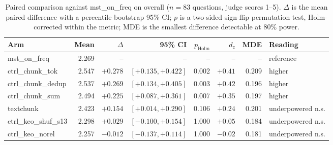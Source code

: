 \begin{table}[t]
\centering
\small
\begin{tabular}{lrrrrrrl}
\toprule
Arm & Mean & $\Delta$ & 95\% CI & $p_{\text{Holm}}$ & $d_z$ & MDE & Reading \\
\midrule
mst\_on\_freq & 2.269 & -- & -- & -- & -- & -- & reference \\
\midrule
ctrl\_chunk\_tok & 2.547 & $+0.278$ & $[+0.135, +0.422]$ & 0.002 & $+0.41$ & 0.209 & higher \\
ctrl\_chunk\_dedup & 2.537 & $+0.269$ & $[+0.134, +0.405]$ & 0.003 & $+0.42$ & 0.196 & higher \\
ctrl\_chunk\_sum & 2.494 & $+0.225$ & $[+0.087, +0.361]$ & 0.007 & $+0.35$ & 0.197 & higher \\
textchunk & 2.423 & $+0.154$ & $[+0.014, +0.290]$ & 0.106 & $+0.24$ & 0.201 & underpowered n.s. \\
ctrl\_keo\_shuf\_s13 & 2.298 & $+0.029$ & $[-0.100, +0.154]$ & 1.000 & $+0.05$ & 0.184 & underpowered n.s. \\
ctrl\_keo\_norel & 2.257 & $-0.012$ & $[-0.137, +0.114]$ & 1.000 & $-0.02$ & 0.181 & underpowered n.s. \\
\bottomrule
\end{tabular}
\caption{Paired comparison against mst\_on\_freq on overall ($n=83$ questions, judge scores 1--5). $\Delta$ is the mean paired difference with a percentile bootstrap 95\% CI; $p$ is a two-sided sign-flip permutation test, Holm-corrected within the metric; MDE is the smallest difference detectable at 80\% power.}
\label{tab:paired-overall}
\end{table}
